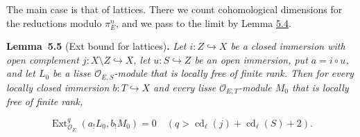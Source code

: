 \documentclass[11pt]{article}
\newenvironment{bpstatement}[2]{\par\addvspace{0.6\baselineskip}\noindent\textbf{#1}#2\textbf{.}\enspace\ignorespaces}
  {\par\addvspace{0.4\baselineskip}}
\newenvironment{bpstatementit}[2]{\begin{bpstatement}{#1}{#2}\itshape\ignorespaces}{\end{bpstatement}}
\providecommand{\Ext}{}\renewcommand{\Ext}{\operatorname{Ext}}
\begin{document}
\label{bp423}%
The main case is that of lattices. There we count cohomological dimensions for the reductions modulo \(\pi_E^n\), and we pass to the limit by Lemma \hyperref[bp421]{5.4}.

\label{bp424}%
\begin{bpstatementit}{Lemma~5.5}{ (Ext bound for lattices)}
Let \(i:Z\hookrightarrow X\) be a closed immersion with open complement \(j:X\setminus Z\hookrightarrow X\), let \(u:S\hookrightarrow Z\) be an open immersion, put \(a=i\circ u\), and let \(L_0\) be a lisse \(\mathcal O_{E,S}\)-module that is locally free of finite rank. Then for every locally closed immersion \(b:T\hookrightarrow X\) and every lisse \(\mathcal O_{E,T}\)-module \(M_0\) that is locally free of finite rank,

\[
\Ext^q_{\mathcal O_E}(a_!L_0,b_!M_0)=0
\quad(q>\operatorname{cd}_\ell(j)+\operatorname{cd}_\ell(S)+2).
\tag{5.1}
\]
\end{bpstatementit}
\end{document}
